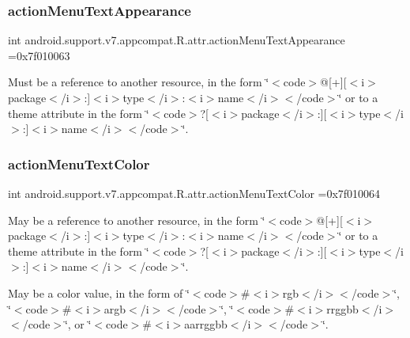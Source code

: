 \subsubsection{\texorpdfstring{action\+Menu\+Text\+Appearance}{actionMenuTextAppearance}}
{\footnotesize\ttfamily int android.\+support.\+v7.\+appcompat.\+R.\+attr.\+action\+Menu\+Text\+Appearance =0x7f010063\hspace{0.3cm}{\ttfamily [static]}}

Must be a reference to another resource, in the form \char`\"{}$<$code$>$@\mbox{[}+\mbox{]}\mbox{[}$<$i$>$package$<$/i$>$\+:\mbox{]}$<$i$>$type$<$/i$>$\+:$<$i$>$name$<$/i$>$$<$/code$>$\char`\"{} or to a theme attribute in the form \char`\"{}$<$code$>$?\mbox{[}$<$i$>$package$<$/i$>$\+:\mbox{]}\mbox{[}$<$i$>$type$<$/i$>$\+:\mbox{]}$<$i$>$name$<$/i$>$$<$/code$>$\char`\"{}. \mbox{\label{classandroid_1_1support_1_1v7_1_1appcompat_1_1R_1_1attr_a9ac5cc329fd14ece75b0ee49b520bbb5}} 
\subsubsection{\texorpdfstring{action\+Menu\+Text\+Color}{actionMenuTextColor}}
{\footnotesize\ttfamily int android.\+support.\+v7.\+appcompat.\+R.\+attr.\+action\+Menu\+Text\+Color =0x7f010064\hspace{0.3cm}{\ttfamily [static]}}

May be a reference to another resource, in the form \char`\"{}$<$code$>$@\mbox{[}+\mbox{]}\mbox{[}$<$i$>$package$<$/i$>$\+:\mbox{]}$<$i$>$type$<$/i$>$\+:$<$i$>$name$<$/i$>$$<$/code$>$\char`\"{} or to a theme attribute in the form \char`\"{}$<$code$>$?\mbox{[}$<$i$>$package$<$/i$>$\+:\mbox{]}\mbox{[}$<$i$>$type$<$/i$>$\+:\mbox{]}$<$i$>$name$<$/i$>$$<$/code$>$\char`\"{}. 

May be a color value, in the form of \char`\"{}$<$code$>$\#$<$i$>$rgb$<$/i$>$$<$/code$>$\char`\"{}, \char`\"{}$<$code$>$\#$<$i$>$argb$<$/i$>$$<$/code$>$\char`\"{}, \char`\"{}$<$code$>$\#$<$i$>$rrggbb$<$/i$>$$<$/code$>$\char`\"{}, or \char`\"{}$<$code$>$\#$<$i$>$aarrggbb$<$/i$>$$<$/code$>$\char`\"{}. \mbox{\label{classandroid_1_1support_1_1v7_1_1appcompat_1_1R_1_1attr_ae72385f347b4f74aea4d77340a4ab5a4}} 

